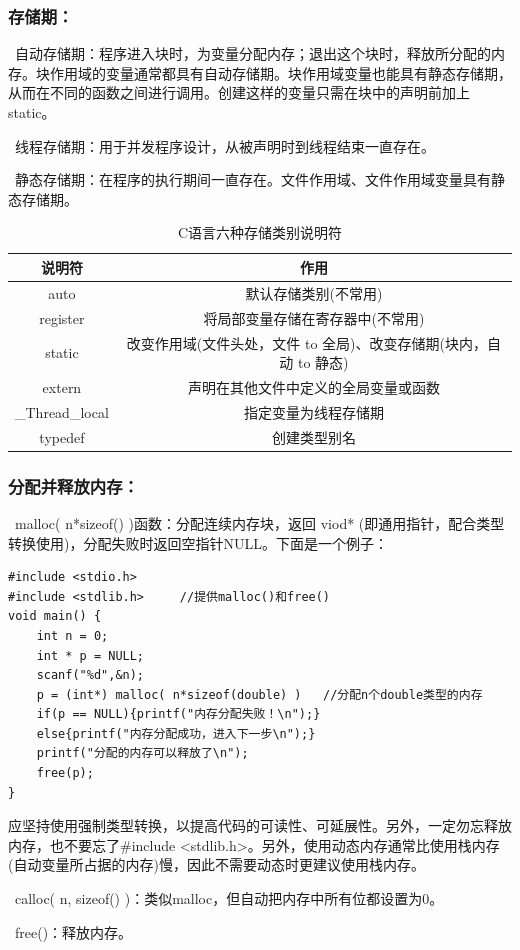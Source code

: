 \documentclass[zihao=-4,UTF8]{report}
\begin{document}
\subsubsection{存储期：}
\ 自动存储期：程序进入块时，为变量分配内存；退出这个块时，释放所分配的内存。{\color{gray}\small 块作用域的变量通常都具有自动存储期。块作用域变量也能具有静态存储期，从而在不同的函数之间进行调用。创建这样的变量只需在块中的声明前加上static。}\par
{}\ 线程存储期：用于并发程序设计，从被声明时到线程结束一直存在。\par
{}\ 静态存储期：在程序的执行期间一直存在。{\color{gray}\small 文件作用域、文件作用域变量具有静态存储期。}\par

\begin{table}[H]
    \centering
    \caption{C语言六种存储类别说明符}
    \begin{tabular}{cc}
        \toprule
        说明符 & 作用\\
        \hline
        auto & 默认存储类别(不常用)\\
        register & 将局部变量存储在寄存器中(不常用)\\
        static & 改变作用域(文件头处，文件 to 全局)、改变存储期(块内，自动 to 静态)\\
        extern & 声明在其他文件中定义的全局变量或函数\\
        \_Thread\_local & 指定变量为线程存储期\\
        typedef & 创建类型别名\\
        \bottomrule
    \end{tabular}
\end{table}
\subsubsection{分配并释放内存：}
\ malloc( n*sizeof() )函数：分配连续内存块，返回 viod* (即通用指针，配合类型转换使用)，分配失败时返回空指针NULL。下面是一个例子：
\begin{lstlisting}
#include <stdio.h>
#include <stdlib.h>     //提供malloc()和free()
void main() {
    int n = 0;
    int * p = NULL;
    scanf("%d",&n);
    p = (int*) malloc( n*sizeof(double) )   //分配n个double类型的内存
    if(p == NULL){printf("内存分配失败！\n");}
    else{printf("内存分配成功，进入下一步\n");}
    printf("分配的内存可以释放了\n");
    free(p);
}
\end{lstlisting}
{\color{gray}\small 应坚持使用强制类型转换，以提高代码的可读性、可延展性。另外，一定勿忘释放内存，也不要忘了\#include <stdlib.h>。另外，使用动态内存通常比使用栈内存(自动变量所占据的内存)慢，因此不需要动态时更建议使用栈内存。}\par
{}\ calloc( n, sizeof() )：类似malloc，但自动把内存中所有位都设置为0。\par
{}\ free()：释放内存。\par
\end{document}
